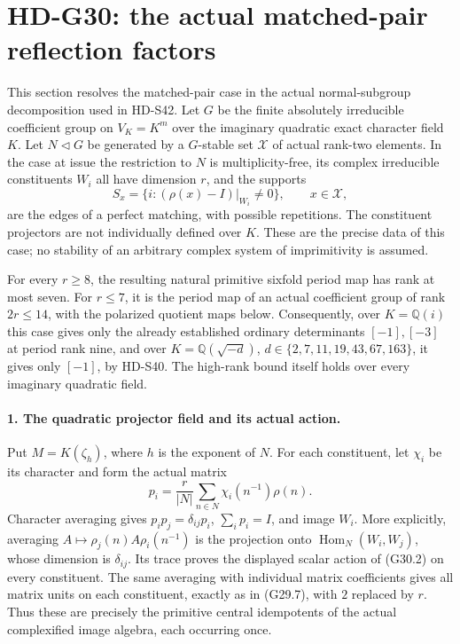\section{HD-G30: the actual matched-pair reflection factors}
\label{sec:matched-pair-reflection-factors}

This section resolves the matched-pair case in the actual
normal-subgroup decomposition used in HD-S42. Let \(G\) be
the finite absolutely irreducible coefficient group on \(V_K=K^m\) over the
imaginary quadratic exact character field \(K\). Let
\(N\triangleleft G\) be generated by a \(G\)-stable set
\(\mathcal X\) of actual rank-two elements. In the case at
issue the restriction to \(N\) is multiplicity-free, its
complex irreducible constituents \(W_i\) all have dimension
\(r\), and the supports
\[
 S_x=\{i:(\rho(x)-I)|_{W_i}\ne0\},\qquad x\in\mathcal X,
                                                               \tag{G30.1}
\]
are the edges of a perfect matching, with possible repetitions.
The constituent projectors are not individually defined over
\(K\). These are the precise data of this case; no stability
of an arbitrary complex system of imprimitivity is assumed.

For every \(r\ge8\), the resulting natural primitive
sixfold period map has rank at most seven. For \(r\le7\),
it is the period map of an actual coefficient group of rank
\(2r\le14\), with the polarized quotient maps below.
Consequently, over \(K=\mathbb Q(i)\) this case gives only
the already established ordinary determinants \([-1],[-3]\)
at period rank nine, and over
\(K=\mathbb Q(\sqrt{-d})\),
\(d\in\{2,7,11,19,43,67,163\}\), it gives only
\([-1]\), by HD-S40. The high-rank bound itself holds over
every imaginary quadratic field.

\paragraph{1. The quadratic projector field and its actual action.}
Put \(M=K(\zeta_h)\), where \(h\) is the exponent of
\(N\). For each constituent, let \(\chi_i\) be its
character and form the actual matrix
\[
 p_i=\frac r{|N|}\sum_{n\in N}\chi_i(n^{-1})\rho(n).
                                                               \tag{G30.2}
\]
Character averaging gives \(p_ip_j=\delta_{ij}p_i\),
\(\sum_i p_i=I\), and image \(W_i\). More explicitly,
averaging \(A\mapsto\rho_j(n)A\rho_i(n^{-1})\) is the
projection onto \(\operatorname{Hom}_N(W_i,W_j)\), whose
dimension is \(\delta_{ij}\). Its trace proves the
displayed scalar action of (G30.2) on every constituent.
The same averaging with individual matrix coefficients gives
all matrix units on each constituent, exactly as in
(G29.7), with \(2\) replaced by \(r\). Thus these are
precisely the primitive central idempotents of the actual
complexified image algebra, each occurring once.

